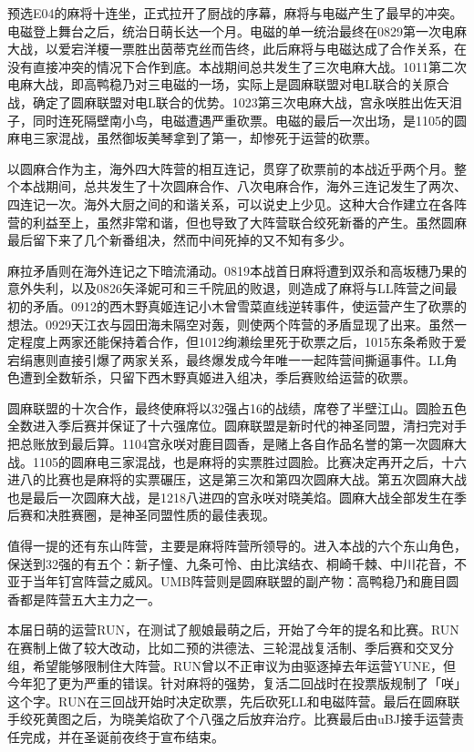 预选E04的麻将十连坐，正式拉开了厨战的序幕，麻将与电磁产生了最早的冲突。电磁登上舞台之后，统治日萌长达一个月。电磁的单一统治最终在0829第一次电麻大战，以爱宕洋榎一票胜出茵蒂克丝而告终，此后麻将与电磁达成了合作关系，在没有直接冲突的情况下合作到底。本战期间总共发生了三次电麻大战。1011第二次电麻大战，即高鸭稳乃对三电磁的一场，实际上是圆麻联盟对电L联合的关原合战，确定了圆麻联盟对电L联合的优势。1023第三次电麻大战，宫永咲胜出佐天泪子，同时连死隔壁南小鸟，电磁遭遇严重砍票。电磁的最后一次出场，是1105的圆麻电三家混战，虽然御坂美琴拿到了第一，却惨死于运营的砍票。

以圆麻合作为主，海外四大阵营的相互连记，贯穿了砍票前的本战近乎两个月。整个本战期间，总共发生了十次圆麻合作、八次电麻合作，海外三连记发生了两次、四连记一次。海外大厨之间的和谐关系，可以说史上少见。这种大合作建立在各阵营的利益至上，虽然非常和谐，但也导致了大阵营联合绞死新番的产生。虽然圆麻最后留下来了几个新番组决，然而中间死掉的又不知有多少。

麻拉矛盾则在海外连记之下暗流涌动。0819本战首日麻将遭到双杀和高坂穗乃果的意外失利，以及0826矢泽妮可和三千院凪的败退，则造成了麻将与LL阵营之间最初的矛盾。0912的西木野真姬连记小木曾雪菜直线逆转事件，使运营产生了砍票的想法。0929天江衣与园田海未隔空对轰，则使两个阵营的矛盾显现了出来。虽然一定程度上两家还能保持着合作，但1012绚濑绘里死于砍票之后，1015东条希败于爱宕绢惠则直接引爆了两家关系，最终爆发成今年唯一一起阵营间撕逼事件。LL角色遭到全数斩杀，只留下西木野真姬进入组决，季后赛败给运营的砍票。

圆麻联盟的十次合作，最终使麻将以32强占16的战绩，席卷了半壁江山。圆脸五色全数进入季后赛并保证了十六强席位。圆麻联盟是新时代的神圣同盟，清扫完对手把总账放到最后算。1104宫永咲对鹿目圆香，是赌上各自作品名誉的第一次圆麻大战。1105的圆麻电三家混战，也是麻将的实票胜过圆脸。比赛决定再开之后，十六进八的比赛也是麻将的实票碾压，这是第三次和第四次圆麻大战。第五次圆麻大战也是最后一次圆麻大战，是1218八进四的宫永咲对晓美焰。圆麻大战全部发生在季后赛和决胜赛圈，是神圣同盟性质的最佳表现。

值得一提的还有东山阵营，主要是麻将阵营所领导的。进入本战的六个东山角色，保送到32强的有五个：新子憧、九条可怜、由比滨结衣、桐崎千棘、中川花音，不亚于当年钉宫阵营之威风。UMB阵营则是圆麻联盟的副产物：高鸭稳乃和鹿目圆香都是阵营五大主力之一。

本届日萌的运营RUN，在测试了舰娘最萌之后，开始了今年的提名和比赛。RUN在赛制上做了较大改动，比如二预的洪德法、三轮混战复活制、季后赛和交叉分组，希望能够限制住大阵营。RUN曾以不正审议为由驱逐掉去年运营YUNE，但今年犯了更为严重的错误。针对麻将的强势，复活二回战时在投票版规制了「咲」这个字。RUN在三回战开始时决定砍票，先后砍死LL和电磁阵营。最后在圆麻联手绞死黄图之后，为晓美焰砍了个八强之后放弃治疗。比赛最后由uBJ接手运营责任完成，并在圣诞前夜终于宣布结束。

